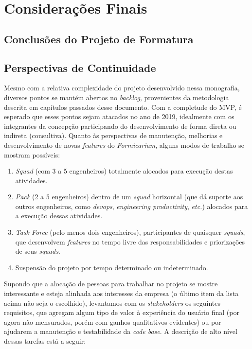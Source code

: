 \chapter{Considerações Finais}
	\section{Conclusões do Projeto de Formatura} %
	\section{Perspectivas de Continuidade}
	Mesmo com a relativa complexidade do projeto desenvolvido nessa monografia, diversos pontos se mantém abertos no \textit{backlog}, provenientes da metodologia descrita em capítulos passados desse documento. Com a completude do MVP, é esperado que esses pontos sejam atacados no ano de 2019, idealmente com os integrantes da concepção participando do desenvolvimento de forma direta ou indireta (consultiva). Quanto às perspectivas de manutenção, melhorias e desenvolvimento de novas \textit{features} do \textit{Formicarium}, alguns modos de trabalho se mostram possíveis:
	\begin{enumerate}
	    \item \textit{Squad} (com 3 a 5 engenheiros) totalmente alocados para execução destas atividades.
	    \item \textit{Pack} (2 a 5 engenheiros) dentro de um \textit{squad} horizontal (que dá suporte aos outros engenheiros, como \textit{devops}, \textit{engineering productivity}, \textit{etc.}) alocados para a execução dessas atividades.
	    \item \textit{Task Force} (pelo menos dois engenheiros), participantes de quaisquer \textit{squads}, que desenvolvem \textit{features} no tempo livre das responsabilidades e priorizações de seus \textit{squads}.
	    \item Suspensão do projeto por tempo determinado ou indeterminado.
	\end{enumerate}
	
	Supondo que a alocação de pessoas para trabalhar no projeto se mostre interessante e esteja alinhada aos interesses da empresa (o último item da lista acima não seja o escolhido), levantamos com os \textit{stakeholders} os seguintes requisitos, que agregam algum tipo de valor à experiência do usuário final (por agora não mensurados, porém com ganhos qualitativos evidentes) ou por ajudarem a manutenção e testabilidade da \textit{code base}. A descrição de alto nível dessas tarefas está a seguir:
	
